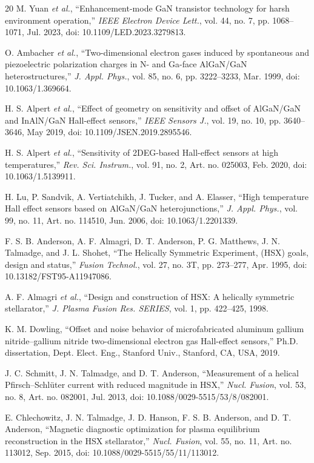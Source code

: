 \documentclass{IEEE_lsens}
\begin{document}
\begin{thebibliography}{20}
M. Yuan \emph{et al.}, ``Enhancement-mode GaN transistor technology for harsh environment operation,'' \emph{IEEE Electron Device Lett.}, vol. 44, no. 7, pp. 1068--1071, Jul. 2023, doi: 10.1109/LED.2023.3279813.

O. Ambacher \emph{et al.}, ``Two-dimensional electron gases induced by spontaneous and piezoelectric polarization charges in N- and Ga-face AlGaN/GaN heterostructures,'' \emph{J. Appl. Phys.}, vol. 85, no. 6, pp. 3222--3233, Mar. 1999, doi: 10.1063/1.369664.

H. S. Alpert \emph{et al.}, ``Effect of geometry on sensitivity and offset of AlGaN/GaN and InAlN/GaN Hall-effect sensors,'' \emph{IEEE Sensors J.}, vol. 19, no. 10, pp. 3640--3646, May 2019, doi: 10.1109/JSEN.2019.2895546.

H. S. Alpert \emph{et al.}, ``Sensitivity of 2DEG-based Hall-effect sensors at high temperatures,'' \emph{Rev. Sci. Instrum.}, vol. 91, no. 2, Art. no. 025003, Feb. 2020, doi: 10.1063/1.5139911.

H. Lu, P. Sandvik, A. Vertiatchikh, J. Tucker, and A. Elasser, ``High temperature Hall effect sensors based on AlGaN/GaN heterojunctions,'' \emph{J. Appl. Phys.}, vol. 99, no. 11, Art. no. 114510, Jun. 2006, doi: 10.1063/1.2201339.

F. S. B. Anderson, A. F. Almagri, D. T. Anderson, P. G. Matthews, J. N. Talmadge, and J. L. Shohet, ``The Helically Symmetric Experiment, (HSX) goals, design and status,'' \emph{Fusion Technol.}, vol. 27, no. 3T, pp. 273--277, Apr. 1995, doi: 10.13182/FST95-A11947086.

A. F. Almagri \emph{et al.}, ``Design and construction of HSX: A helically symmetric stellarator,'' \emph{J. Plasma Fusion Res. SERIES}, vol. 1, pp. 422--425, 1998.

K. M. Dowling, ``Offset and noise behavior of microfabricated aluminum gallium nitride--gallium nitride two-dimensional electron gas Hall-effect sensors,'' Ph.D. dissertation, Dept. Elect. Eng., Stanford Univ., Stanford, CA, USA, 2019.

J. C. Schmitt, J. N. Talmadge, and D. T. Anderson, ``Measurement of a helical Pfirsch--Schl\"uter current with reduced magnitude in HSX,'' \emph{Nucl. Fusion}, vol. 53, no. 8, Art. no. 082001, Jul. 2013, doi: 10.1088/0029-5515/53/8/082001.

E. Chlechowitz, J. N. Talmadge, J. D. Hanson, F. S. B. Anderson, and D. T. Anderson, ``Magnetic diagnostic optimization for plasma equilibrium reconstruction in the HSX stellarator,'' \emph{Nucl. Fusion}, vol. 55, no. 11, Art. no. 113012, Sep. 2015, doi: 10.1088/0029-5515/55/11/113012.

\end{thebibliography}


\end{document}
